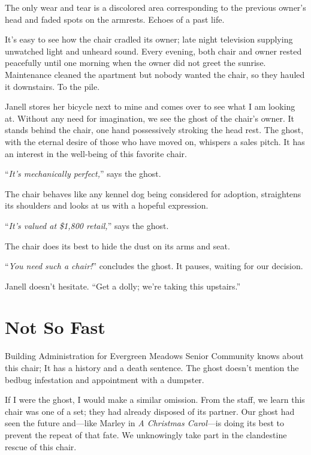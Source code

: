 \documentclass[
  letterpaper,
  DIV=11,
  numbers=noendperiod]{scrreprt}
\begin{document}
The only wear and tear is a discolored area corresponding to the
previous owner's head and faded spots on the armrests. Echoes of a past
life.

It's easy to see how the chair cradled its owner; late night television
supplying unwatched light and unheard sound. Every evening, both chair
and owner rested peacefully until one morning when the owner did not
greet the sunrise. Maintenance cleaned the apartment but nobody wanted
the chair, so they hauled it downstairs. To the pile.

Janell stores her bicycle next to mine and comes over to see what I am
looking at. Without any need for imagination, we see the ghost of the
chair's owner. It stands behind the chair, one hand possessively
stroking the head rest. The ghost, with the eternal desire of those who
have moved on, whispers a sales pitch. It has an interest in the
well-being of this favorite chair.

``\emph{It's mechanically perfect,}'' says the ghost.

The chair behaves like any kennel dog being considered for adoption,
straightens its shoulders and looks at us with a hopeful expression.

``\emph{It's valued at \$1,800 retail,}'' says the ghost.

The chair does its best to hide the dust on its arms and seat.

``\emph{You need such a chair!}'' concludes the ghost. It pauses,
waiting for our decision.

Janell doesn't hesitate. ``Get a dolly; we're taking this upstairs.''

\section*{Not So Fast}\label{not-so-fast}


Building Administration for Evergreen Meadows Senior Community knows
about this chair; It has a history and a death sentence. The ghost
doesn't mention the bedbug infestation and appointment with a dumpster.

If I were the ghost, I would make a similar omission. From the staff, we
learn this chair was one of a set; they had already disposed of its
partner. Our ghost had seen the future and---like Marley in \emph{A
Christmas Carol}---is doing its best to prevent the repeat of that fate.
We unknowingly take part in the clandestine rescue of this chair.
\end{document}

